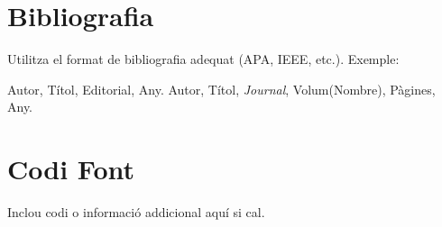 \documentclass[a4paper,12pt]{article}
\begin{document}
\section{Bibliografia}
Utilitza el format de bibliografia adequat (APA, IEEE, etc.). Exemple:
\begin{thebibliography}{9}
     Autor, Títol, Editorial, Any.
     Autor, Títol, \textit{Journal}, Volum(Nombre), Pàgines, Any.
\end{thebibliography}


\appendix
\section{Codi Font}
Inclou codi o informació addicional aquí si cal.
\end{document}
